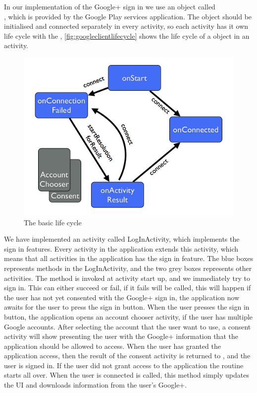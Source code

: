 In our implementation of the Google+ sign in we use an object called \\\citep{googleapiclient-docs}, which is provided by the Google Play services application. 
The object  should be initialised and connected separately in every activity, so each activity has it own life cycle with the , \autoref{fig:googleclientlifecycle} shows the life cycle of a  object in an activity.
\begin{figure}[H]
\centering
\includegraphics[width=0.75\linewidth]{img/googleclientflow.png}
\caption{The  basic life cycle\cite{googleapiclient-lifecycle}}
\label{fig:googleclientlifecycle}
\end{figure}
We have implemented an activity called LogInActivity, which implements the sign in features. Every activity in the application extends this activity, which means that all activities in the application has the sign in feature. 
The blue boxes represents methods in the LogInActivity, and the two grey boxes represents other activities. The method  is invoked at activity start up, and we immediately try to sign in. 
This can either succeed or fail, if it fails  will be called, this will happen if the user has not yet consented with the Google+ sign in, the application now awaits for the user to press the sign in button. 
When the user presses the sign in button, the application opens an account chooser activity, if the user has multiple Google accounts. 
After selecting the account that the user want to use, a consent activity will show presenting the user with the Google+ information that the application should be allowed to access. 
When the user has granted the application access, then the result of the consent activity is returned to , and the user is signed in. 
If the user did not grant access to the application the routine starts all over. When the user is connected  is called, this method simply updates the UI and downloads information from the user's Google+.

